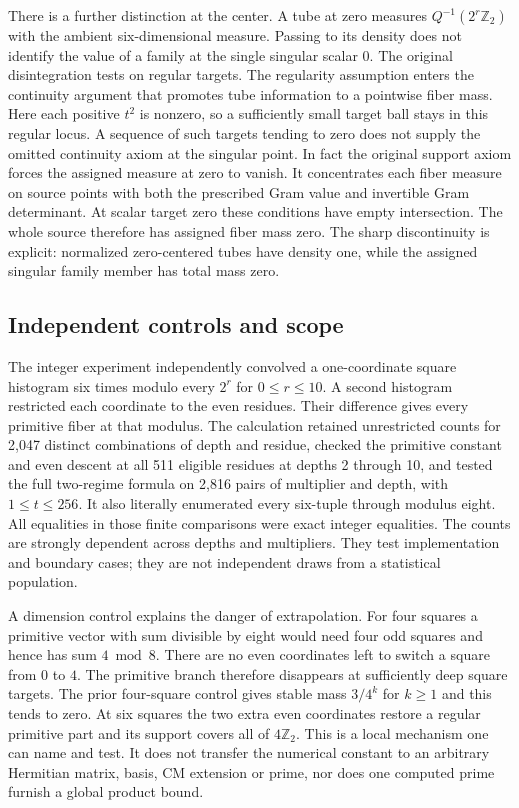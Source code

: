 \documentclass[12pt,letterpaper]{article}
\begin{document}
There is a further distinction at the center. A tube at zero measures $Q^{-1}(2^r\mathbb Z_2)$ with the ambient six-dimensional measure. Passing to its density does not identify the value of a family at the single singular scalar $0$. The original disintegration tests on regular targets. The regularity assumption enters the continuity argument that promotes tube information to a pointwise fiber mass. Here each positive $t^2$ is nonzero, so a sufficiently small target ball stays in this regular locus. A sequence of such targets tending to zero does not supply the omitted continuity axiom at the singular point. In fact the original support axiom forces the assigned measure at zero to vanish. It concentrates each fiber measure on source points with both the prescribed Gram value and invertible Gram determinant. At scalar target zero these conditions have empty intersection. The whole source therefore has assigned fiber mass zero. The sharp discontinuity is explicit: normalized zero-centered tubes have density one, while the assigned singular family member has total mass zero.

\subsection{Independent controls and scope}
The integer experiment independently convolved a one-coordinate square histogram six times modulo every $2^r$ for $0\le r\le10$. A second histogram restricted each coordinate to the even residues. Their difference gives every primitive fiber at that modulus. The calculation retained unrestricted counts for 2,047 distinct combinations of depth and residue, checked the primitive constant and even descent at all 511 eligible residues at depths 2 through 10, and tested the full two-regime formula on 2,816 pairs of multiplier and depth, with $1\le t\le256$. It also literally enumerated every six-tuple through modulus eight. All equalities in those finite comparisons were exact integer equalities. The counts are strongly dependent across depths and multipliers. They test implementation and boundary cases; they are not independent draws from a statistical population.

A dimension control explains the danger of extrapolation. For four squares a primitive vector with sum divisible by eight would need four odd squares and hence has sum $4\bmod8$. There are no even coordinates left to switch a square from $0$ to $4$. The primitive branch therefore disappears at sufficiently deep square targets. The prior four-square control gives stable mass $3/4^k$ for $k\ge1$ and this tends to zero. At six squares the two extra even coordinates restore a regular primitive part and its support covers all of $4\mathbb Z_2$. This is a local mechanism one can name and test. It does not transfer the numerical constant to an arbitrary Hermitian matrix, basis, CM extension or prime, nor does one computed prime furnish a global product bound.
\end{document}
